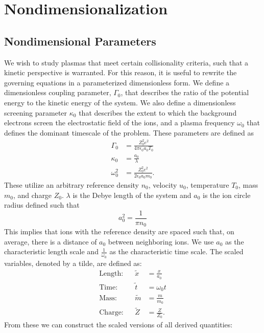 \documentclass{article}
\begin{document}
\section{Nondimensionalization}

\subsection{Nondimensional Parameters}
We wish to study plasmas that meet certain collisionality criteria, such that a kinetic perspective is warranted. For this reason, it is useful to rewrite the governing equations in a parameterized dimensionless form. We define a dimensionless coupling parameter, $\Gamma_0$, that describes the ratio of the potential energy to the kinetic energy of the system. We also define a dimensionless screening parameter $\kappa_0$ that describes the extent to which the background electrons screen the electrostatic field of the ions, and a plasma frequency $\omega_0$ that defines the dominant timescale of the problem. These parameters are defined as
\begin{align}
\Gamma_0 	&= \frac{Z_0^2e^2}{4\pi\epsilon_0a_0T_0} \\
\kappa_0           &= \frac{a_0}{\lambda}\\
\omega_0^2	&= \frac{Z_0^2e^2}{2\epsilon_0a_0m_0}.
\end{align}These utilize an arbitrary reference density $n_0$, velocity $u_0$, temperature $T_0$, mass $m_0$, and charge $Z_0$. $\lambda$ is the Debye length of the system and $a_0$ is the ion circle radius defined such that
\begin{equation}
a_0^2 		= \frac{1}{\pi n_0}
\end{equation}This implies that ions with the reference density are spaced such that, on average, there is a distance of $a_0$ between neighboring ions. We use $a_0$ as the characteristic length scale and $\frac{1}{\omega_0}$ as the characteristic time scale. The scaled variables, denoted by a tilde, are defined as:
\begin{align*}
\text{Length:}&			&\tilde{x} &= \frac{x}{a_0} 	\\
\text{Time:}&			&\tilde{t} &= \omega_0 t 	\\
\text{Mass:}&			&\tilde{m} &= \frac{m}{m_0} 	\\
\text{Charge:}&			&\tilde{Z} &= \frac{Z}{Z_0}.	
\end{align*}From these we can construct the scaled versions of all derived quantities:
\end{document}
